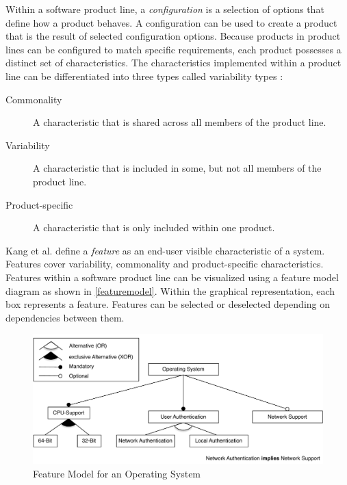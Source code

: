 \documentclass[a4paper]{article}
\begin{document}
Within a software product line, a \emph{configuration} is a selection of options that define how a product behaves. A configuration can be used to create a product that is the result of selected configuration options.
Because products in product lines can be configured to match specific requirements, each product possesses a distinct set of characteristics. The characteristics implemented within a product line can be differentiated into three types called variability types \cite[p.8]{spl-in-action}:
\begin{description}
\item[Commonality]  A characteristic that is shared across all members of the product line.
\item[Variability]  A characteristic that is included in some, but not all members of the product line.
\item[Product-specific]  A characteristic that is only included within one product. 
\end{description}

Kang et al. \cite{KangFeatureOrientedDomain1990} define a \emph{feature} as an end-user visible characteristic of a system. Features cover variability, commonality and product-specific characteristics. Features within a software product line can be visualized using a feature model diagram as shown in \autoref{featuremodel}. Within the graphical representation, each box represents a feature. Features can be selected or deselected depending on dependencies between them.

\begin{figure}[h] 
  \centering
  \begin{minipage}[b]{1\textwidth} 
    \caption[Feature Model]{Feature Model for an Operating System}\label{featuremodel}
    \includegraphics[width=1\textwidth]{img/featuremodel.pdf}
  \end{minipage}
\end{figure}
\end{document}

